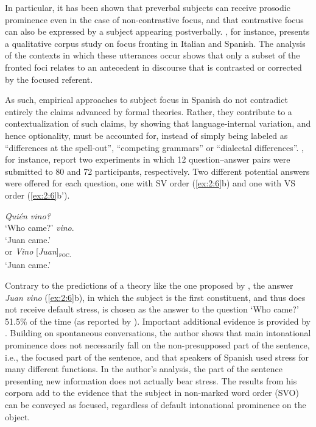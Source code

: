  In particular, it has been shown that preverbal subjects can receive prosodic prominence even in the case of non-contrastive focus, and that contrastive focus can also be expressed by a subject appearing postverbally. \textcite{brunetti2009italian}, for instance, presents a qualitative corpus study on focus fronting in Italian and Spanish. The analysis of the contexts in which these utterances occur shows that only a subset of the fronted foci relates to an antecedent in discourse that is contrasted or corrected by the focused referent.
 
As such, empirical approaches to subject focus in Spanish do not contradict entirely the claims advanced by formal theories. Rather, they contribute to a contextualization of such claims, by showing that language-internal variation, and hence optionality, must be accounted for, instead of simply being labeled as “differences at the spell-out”, “competing grammars” or “dialectal differences”. \textcite{alonso2002null}, for instance, report two experiments in which 12 question–answer pairs were submitted to 80 and 72 participants, respectively. Two different potential answers were offered for each question,  one with SV order (\ref{ex:2:6}b) and one with VS order (\ref{ex:2:6}b').


 \ea \label{ex:2:6}
 \ea \textit{Quién vino?}\\
 `Who came?'
 \normalsize \textit{vino}.\\
`Juan came.'\\
or
 \textit{Vino} {[\textit{Juan}]\textsubscript{\textsc{foc.}}}\normalsize\\
`Juan came.' \hfill \parencite[17]{alonso2002null}    
\z \z


Contrary to the predictions of a theory like the one proposed by \textcite{zubizarreta1999word}, the answer \textit{Juan vino} (\ref{ex:2:6}b), in which the subject is the first constituent, and thus does not receive default stress, is chosen as the answer to the question `Who came?' 51.5\% of the time (as reported by \cite{biezma2014multiple}).  Important additional evidence is provided by \textcite{ocampo2003notion}. Building on spontaneous conversations, the author shows that main intonational prominence does not necessarily fall on the non-presupposed part of the sentence, i.e., the focused part of the sentence, and that speakers of Spanish used stress for many different functions.  In the author's analysis, the part of the sentence presenting new information does not actually bear stress.
The results from his corpora add to the evidence that the subject in non-marked word order (SVO) can be conveyed as focused, regardless of default intonational prominence on the object. 

